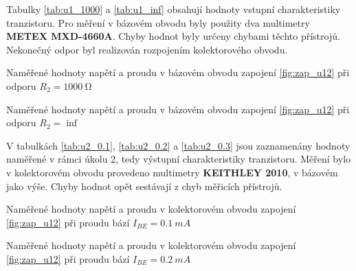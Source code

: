 \documentclass[0-protokol.tex]{subfiles}
\begin{document}
Tabulky \ref{tab:u1_1000} a \ref{tab:u1_inf} obsahují hodnoty vstupní charakteristiky tranzistoru. Pro měření v bázovém obvodu byly použity dva multimetry \textbf{METEX MXD-4660A}. Chyby hodnot byly určeny chybami těchto přístrojů. Nekonečný odpor byl realizován rozpojením kolektorového obvodu.
\begin{table}[H] 
\centering
\setlength{\tabcolsep}{10pt}
\begin{minipage}[t]{0.48\textwidth}

\caption{Naměřené hodnoty napětí a proudu v bázovém obvodu zapojení \ref{fig:zap_u12} při odporu $R_2 = \SI{1000}{\ohm}$}
\label{tab:u1_1000}
\end{minipage}
\hfill
\begin{minipage}[t]{0.48\textwidth}

\caption{Naměřené hodnoty napětí a proudu v bázovém obvodu zapojení \ref{fig:zap_u12} při odporu $R_2 = \inf$}
\label{tab:u1_inf}
\end{minipage}
\end{table}

V tabulkách \ref{tab:u2_0.1}, \ref{tab:u2_0.2} a \ref{tab:u2_0.3} jsou zaznamenány hodnoty naměřené v rámci úkolu 2, tedy výstupní charakteristiky tranzistoru. Měření bylo v kolektorovém obvodu provedeno multimetry \textbf{KEITHLEY 2010}, v bázovém jako výše. Chyby hodnot opět sestávají z chyb měřicích přístrojů.

\begin{table}[H] 
\centering
\setlength{\tabcolsep}{10pt}
\begin{minipage}[t]{0.48\textwidth}

\caption{Naměřené hodnoty napětí a proudu v kolektorovém obvodu zapojení \ref{fig:zap_u12} při proudu bází $I_{BE} = \SI{0.1}{mA}$}
\label{tab:u2_0.1}
\end{minipage}
\hfill
\begin{minipage}[t]{0.48\textwidth}

\caption{Naměřené hodnoty napětí a proudu v kolektorovém obvodu zapojení \ref{fig:zap_u12} při proudu bází $I_{BE} = \SI{0.2}{mA}$}
\label{tab:u2_0.2}
\end{minipage}
\end{table}

\newpage
\end{document}
